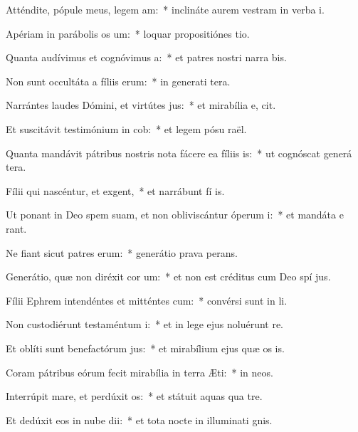 \item Atténdite, pópule meus, legem am:~* inclináte aurem vestram in verba  i.
\item Apériam in parábolis os um:~* loquar propositiónes  tio.
\item Quanta audívimus et cognóvimus a:~* et patres nostri narra bis.
\item Non sunt occultáta a fíliis erum:~* in generati tera.
\item Narrántes laudes Dómini, et virtútes jus:~* et mirabília e,  cit.
\item Et suscitávit testimónium in cob:~* et legem pósu  raël.
\item Quanta mandávit pátribus nostris nota fácere ea fíliis is:~* ut cognóscat generá tera.
\item Fílii qui nascéntur, et exgent,~* et narrábunt fí is.
\item Ut ponant in Deo spem suam, et non obliviscántur óperum i:~* et mandáta e rant.
\item Ne fiant sicut patres erum:~* generátio prava  perans.
\item Generátio, quæ non diréxit cor um:~* et non est créditus cum Deo spí jus.
\item Fílii Ephrem intendéntes et mitténtes cum:~* convérsi sunt in  li.
\item Non custodiérunt testaméntum i:~* et in lege ejus noluérunt re.
\item Et oblíti sunt benefactórum jus:~* et mirabílium ejus quæ os is.
\item Coram pátribus eórum fecit mirabília in terra Æti:~* in  neos.
\item Interrúpit mare, et perdúxit os:~* et státuit aquas qua  tre.
\item Et dedúxit eos in nube dii:~* et tota nocte in illuminati gnis.
